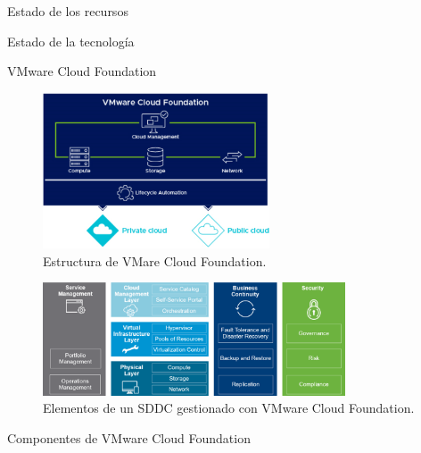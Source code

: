 \begin{chapter}{Estado de los recursos}
\begin{section}{Estado de la tecnología}
\begin{subsection}{VMware Cloud Foundation}
\begin{itemize}
\end{itemize}
\begin{figure}[h!]
    \centering
    \includegraphics[width=0.6\textwidth]{imaxes/cap2recursos/overviewCF.png}
            \caption{Estructura de VMare Cloud Foundation.}
    \label{fig:Cloud-Foundation-Overview}
    \end{figure}
    \FloatBarrier
    \begin{figure}[h]
        \centering
        \includegraphics[width=0.8\textwidth]{imaxes/cap2recursos/SDDCoverview.png}
        \caption{Elementos de un SDDC gestionado con VMware Cloud Foundation.}
        \label{fig:layers-Sddc}
    \end{figure}
    \FloatBarrier
\end{subsection}

\begin{subsection}{Componentes de VMware Cloud Foundation}
\label{subsubsect:cfcomponents}


\end{subsection}
\end{section}
\end{chapter}
